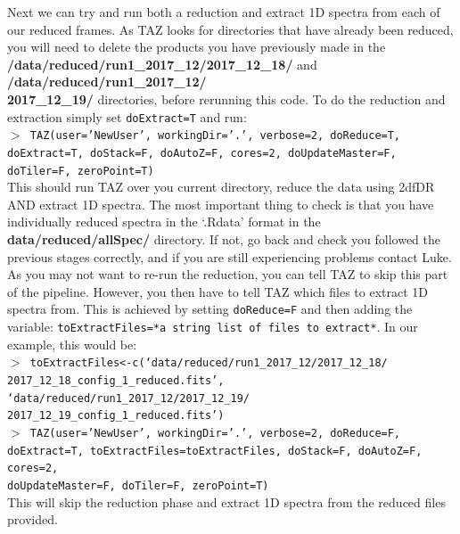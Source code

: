 \documentclass[12pt]{article}
\begin{document}
Next we can try and run both a reduction and extract 1D spectra from each of our reduced frames. As TAZ looks for directories that have already been reduced, you will need to delete the products you have previously made in the \textbf{/data/reduced/run1\_2017\_12/2017\_12\_18/} and \textbf{/data/reduced/run1\_2017\_12/ \\ 2017\_12\_19/} directories, before rerunning this code. To do the reduction and extraction simply set \texttt{doExtract=T} and run:\\

\hspace{10mm} \texttt{$>$ TAZ(user='NewUser', workingDir='.', verbose=2, doReduce=T, doExtract=T, doStack=F, doAutoZ=F, cores=2, doUpdateMaster=F, doTiler=F, zeroPoint=T)}\\

This should run TAZ over you current directory, reduce the data using 2dfDR AND extract 1D spectra. The most important thing to check is that you have individually reduced spectra in the `.Rdata' format in the \textbf{data/reduced/allSpec/} directory. If not, go back and check you followed the previous stages correctly, and if you are still experiencing problems contact Luke.  \\

As you may not want to re-run the reduction, you can tell TAZ to skip this part of the pipeline. However, you then have to tell TAZ which files to extract 1D spectra from. This is achieved by setting  \texttt{doReduce=F} and then adding the variable: \texttt{toExtractFiles=*a string list of files to extract*}. In our example, this would be:\\

 \hspace{10mm} \texttt{$>$ toExtractFiles<-c(`data/reduced/run1\_2017\_12/2017\_12\_18/ \\ 2017\_12\_18\_config\_1\_reduced.fits', `data/reduced/run1\_2017\_12/2017\_12\_19/ \\ 2017\_12\_19\_config\_1\_reduced.fits')}\\
 
  \hspace{10mm} \texttt{$>$ TAZ(user='NewUser', workingDir='.', verbose=2, doReduce=F, doExtract=T, toExtractFiles=toExtractFiles, doStack=F, doAutoZ=F, cores=2, \\ doUpdateMaster=F, doTiler=F, zeroPoint=T)}\\

 This will skip the reduction phase and extract 1D spectra from the reduced files provided.
 
\end{document}
